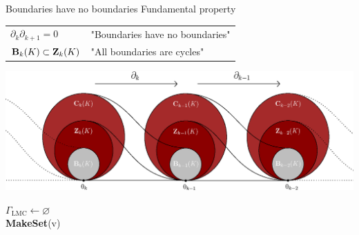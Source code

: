 \begin{frame}{Boundaries have no boundaries}
	Fundamental property
	\begin{tabular}{ll}
	$\partial_{k} \partial_{k+1} = 0$ & "Boundaries have no boundaries" \\
	\pause
	$\mathbf{B}_k(K) \subset \mathbf{Z}_k(K)$ & "All boundaries are cycles"
	\end{tabular}

	\pause
	\begin{center}
		\includegraphics[width=\textwidth]{course/sequence}
	\end{center}
\end{frame}


\begin{frame}
	\begin{minipage}[t][0.5\textheight][t]{0.8\linewidth}
		\scriptsize
		\begin{algorithm}[H]
			\alert<+>{$\Gamma_{\operatorname{LMC}} \leftarrow \varnothing$} \\
			\alert<+>{ {
					\textbf{MakeSet}(v)
			}}
			
		\end{algorithm}
	\end{minipage}		
\end{frame}